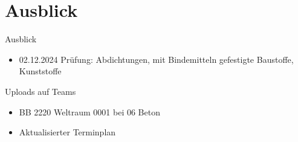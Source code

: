 \section{Ausblick}

\begin{frame}{Ausblick}
	\begin{itemize}
		\item 02.12.2024 Prüfung: Abdichtungen, mit Bindemitteln gefestigte Baustoffe, Kunststoffe
	\end{itemize}
\end{frame}

\begin{frame}{Uploads auf Teams}
    \begin{itemize}
        \item BB 2220 Weltraum 0001 bei 06 Beton
        \item Aktualisierter Terminplan
    \end{itemize}
    
\end{frame}


